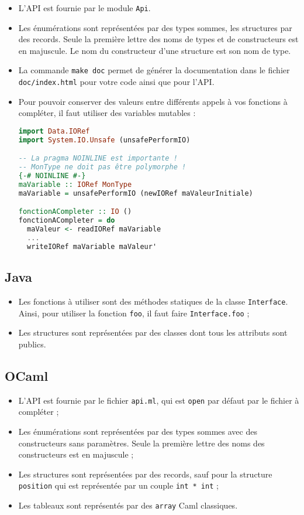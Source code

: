\begin{itemize}
\item{L'API est fournie par le module \texttt{Api}.}
\item{Les énumérations sont représentées par des types sommes, les structures
      par des records. Seule la première lettre des noms de types et de
      constructeurs est en majuscule. Le nom du constructeur d'une structure
      est son nom de type.}
\item{La commande \texttt{make doc} permet de générer la documentation dans le
      fichier \texttt{doc/index.html} pour votre code ainsi que pour l'API.}
\item{Pour pouvoir conserver des valeurs entre différents appels à vos fonctions
      à compléter, il faut utiliser des variables mutables :}
\begin{lstlisting}[language=Haskell]
import Data.IORef
import System.IO.Unsafe (unsafePerformIO)

-- La pragma NOINLINE est importante !
-- MonType ne doit pas être polymorphe !
{-# NOINLINE #-}
maVariable :: IORef MonType
maVariable = unsafePerformIO (newIORef maValeurInitiale)

fonctionACompleter :: IO ()
fonctionACompleter = do
  maValeur <- readIORef maVariable
  ...
  writeIORef maVariable maValeur'

\end{lstlisting}
\end{itemize}

\subsection{Java}

\begin{itemize}
\item{Les fonctions à utiliser sont des méthodes statiques de la classe
      \texttt{Interface}. Ainsi, pour utiliser la fonction \texttt{foo}, il
      faut faire \texttt{Interface.foo} ;}
\item{Les structures sont représentées par des classes dont tous les attributs
      sont publics.}
\end{itemize}

\subsection{OCaml}

\begin{itemize}
\item{L'API est fournie par le fichier \texttt{api.ml}, qui est \texttt{open}
      par défaut par le fichier à compléter ;}
\item{Les énumérations sont représentées par des types sommes avec des
      constructeurs sans paramètres. Seule la première lettre des noms des
      constructeurs est en majuscule ;}
\item{Les structures sont représentées par des records, sauf pour la structure
      \texttt{position} qui est représentée par un couple \texttt{int * int} ;}
\item{Les tableaux sont représentés par des \texttt{array} Caml classiques.}
\end{itemize}

